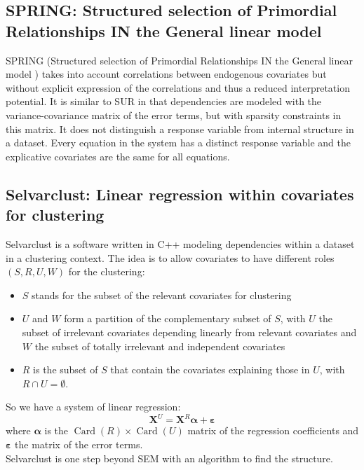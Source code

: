 \documentclass[12pt,a4paper]{report}
\begin{document}
		\subsection{SPRING: Structured selection of Primordial Relationships IN the General linear model}		%

\textsc{SPRING} (Structured selection of Primordial Relationships IN the General linear model \cite{chiquetconf}) takes into account correlations between endogenous covariates but without explicit expression of the correlations and thus a reduced interpretation potential. It is similar to SUR in that dependencies are modeled with the variance-covariance matrix of the error terms, but with sparsity constraints in this matrix.  It does not distinguish a response variable from internal structure in a dataset. Every equation in the system has a distinct response variable and the explicative covariates are the same for all equations.		
		\subsection{Selvarclust: Linear regression within covariates for clustering}		%

			Selvarclust is a software written in C++ modeling dependencies within a dataset			 \cite{maugis2009variable} in a clustering context.
			The idea is to allow covariates to have different roles $(S,R,U,W)$ for the clustering:
			\begin{itemize}
				\item $S$ stands for the subset of the relevant covariates for clustering
				\item $U$ and $W$ form a partition of the complementary subset of $S$, with $U$ the subset of irrelevant covariates depending linearly from relevant covariates and $W$ the subset of totally irrelevant and independent covariates
				\item $R$ is the subset of $S$ that contain the covariates explaining those in $U$, with $R\cap U=\emptyset$.
\end{itemize}			 
So we have a system of linear regression:
\begin{equation}
	\boldsymbol{X}^{U}=\boldsymbol{X}^R \boldsymbol{\alpha}+ \boldsymbol{\varepsilon}
\end{equation}
where $\boldsymbol{\alpha}$ is the $\operatorname{Card}(R)\times \operatorname{Card}(U)$ matrix of the regression coefficients and $\boldsymbol{\varepsilon}$ the matrix of the error terms.\\
Selvarclust is one step beyond SEM with an algorithm to find the structure.		
\end{document}
